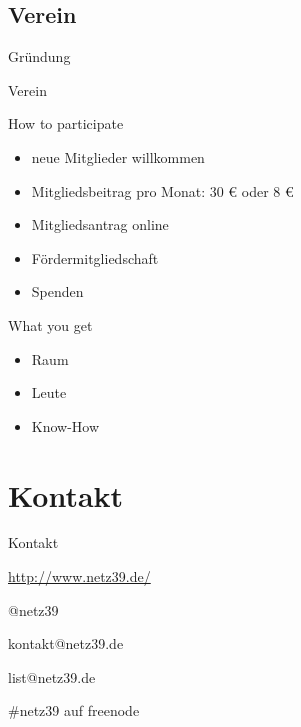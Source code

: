 \documentclass[hyperref={pdfpagelabels=false}]{beamer}
\begin{document}
\subsection{Verein}

\begin{frame}[label=secgruendung]{Gründung}
    \begin{figure}
    \end{figure}
\end{frame}

\begin{frame}{Verein}
    \begin{block}{How to participate}
        \begin{itemize}
            \item neue Mitglieder willkommen
            \item Mitgliedsbeitrag pro Monat: 30 € oder 8 €
            \item Mitgliedsantrag online
            \pause
            \item Fördermitgliedschaft
            \item Spenden
        \end{itemize}
    \end{block}
    \pause
    \begin{block}{What you get}
        \begin{itemize}
            \item Raum
            \item Leute
            \item Know-How
        \end{itemize}
    \end{block}
\end{frame}

\section{Kontakt}

\begin{frame}{Kontakt}
    \begin{description}
        \item[WWW] \url{http://www.netz39.de/}
        \item[Twitter/identi.ca] @netz39
        \item[E-Mail] kontakt@netz39.de
        \item[Mailingliste] list@netz39.de
        \item[IRC] \#netz39 auf freenode
    \end{description}
\end{frame}
\end{document}
